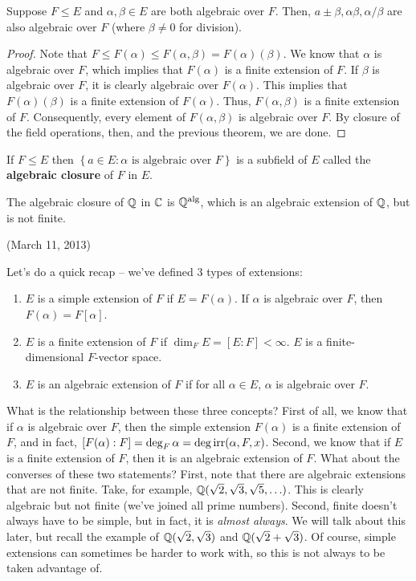 \documentclass{../mathnotes}
\begin{document}
\begin{thm}
    Suppose $F\leq E$ and $\alpha,\beta\in E$ are both algebraic over $F$. Then, $a\pm \beta, \alpha\beta, \alpha/\beta$
    are also algebraic over $F$ (where $\beta\neq 0$ for division).
\end{thm}
\begin{proof}
    Note that $F\leq F(\alpha)\leq F(\alpha,\beta)=F(\alpha)(\beta)$. We know that $\alpha$ is algebraic over $F$, which
    implies that $F(\alpha)$ is a finite extension of $F$. If $\beta$ is algebraic over $F$, it is clearly algebraic over $F(\alpha)$.
    This implies that $F(\alpha)(\beta)$ is a finite extension of $F(\alpha)$. Thus, $F(\alpha,\beta)$ is a finite extension of $F$.
    Consequently, every element of $F(\alpha,\beta)$ is algebraic over $F$. By closure of the field operations, then, and the previous theorem,
    we are done.
\end{proof}

\begin{cor}
    If $F\leq E$ then $\left\{ a\in E:\alpha\text{ is algebraic over }F \right\}$ is a subfield of $E$ called the \textbf{algebraic closure} of
    $F$ in $E$.
\end{cor}

\begin{exmp}
    The algebraic closure of $\mathbb{Q}$ in $\mathbb{C}$ is $\mathbb{Q}^{\rm alg}$, which is an algebraic extension of $\mathbb{Q}$, but is not finite.
\end{exmp}

(March 11, 2013)

Let's do a quick recap -- we've defined 3 types of extensions:
\begin{enumerate}
    \item $E$ is a simple extension of $F$ if $E=F(\alpha)$. If $\alpha$ is algebraic over $F$, then $F(\alpha)=F[\alpha]$.
    \item $E$ is a finite extension of $F$ if $\dim_FE=[E:F]<\infty$. $E$ is a finite-dimensional $F$-vector space.
    \item $E$ is an algebraic extension of $F$ if for all $\alpha\in E$, $\alpha$ is algebraic over $F$.
\end{enumerate}

What is the relationship between these three concepts? First of all, we know that if $\alpha$ is algebraic over $F$, then
the simple extension $F(\alpha)$ is a finite extension of $F$, and in fact, $[F(\alpha):F]=\deg_F\alpha=\deg\operatorname{irr}(\alpha,F,x)$. 
Second, we know that if $E$ is a finite extension of $F$, then it is an algebraic extension of $F$. What about the converses of
these two statements? First, note that there are algebraic extensions that are not finite. Take, for example, $\mathbb{Q}(\sqrt{2},\sqrt{3},\sqrt{5},\ldots)$.
This is clearly algebraic but not finite (we've joined all prime numbers). Second, finite doesn't always have to be simple, but in fact,
it is \textit{almost always}. We will talk about this later, but recall the example of $\mathbb{Q}(\sqrt{2},\sqrt{3})$ and $\mathbb{Q}(\sqrt{2}+\sqrt{3})$.
Of course, simple extensions can sometimes be harder to work with, so this is not always to be taken advantage of.
\end{document}

